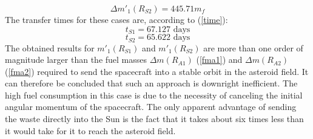 \documentclass[onecolumn,12pt]{article}
\numberwithin{equation}{section}
\begin{document}
\begin{equation}
    \Delta m'_1 (R_{S2}) = 445.71 m_f
    \label{gandon2}
\end{equation}
The transfer times for these cases are, according to (\ref{time}):
\begin{equation}
    t_{S1} = 67.127 \text{ days}
\end{equation}
\begin{equation}
    t_{S2} = 65.622 \text{ days}
\end{equation}
The obtained results for $m'_1 (R_{S1})$ and $m'_1 (R_{S2})$ are more than one order of magnitude larger than the fuel masses $\Delta m (R_{A1})$ (\ref{fma1}) and $\Delta m (R_{A2})$ (\ref{fma2}) required to send the spacecraft into a stable orbit in the asteroid field. It can therefore be concluded that such an approach is downright inefficient. The high fuel consumption in this case is due to the necessity of canceling the initial angular momentum of the spacecraft. The only apparent advantage of sending the waste directly into the Sun is the fact that it takes about six times less than it would take for it to reach the asteroid field.
\end{document}

